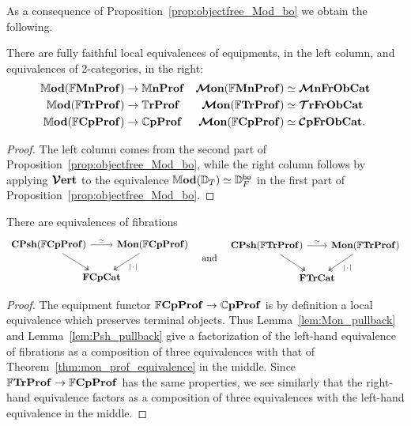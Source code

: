 \documentclass[11pt,oneside,article]{memoir}
\begin{document}
As a consequence of Proposition~\ref{prop:objectfree_Mod_bo} we obtain the following.
\begin{corollary}
      \label{cor:TrCat_ObjectFree}
   There are fully faithful local equivalences of equipments, in the left column, and equivalences
   of 2-categories, in the right:
   \begin{align*}
      \mathbb{M}\mathbf{od}(\mathbb{F}\mathbf{MnProf})  &\to \mathbb{M}\mathbf{nProf} &\bm{\mathcal{M}}\mathbf{on}(\mathbb{F}\mathbf{MnProf})&\simeq\bm{\mathcal{M}}\mathbf{nFrObCat}\\
      \mathbb{M}\mathbf{od}(\mathbb{F}\mathbf{TrProf})   &\to \mathbb{T}\mathbf{rProf}  &\bm{\mathcal{M}}\mathbf{on}(\mathbb{F}\mathbf{TrProf})&\simeq\bm{\mathcal{T}}\mathbf{rFrObCat}\\
      \mathbb{M}\mathbf{od}(\mathbb{F}\mathbf{CpProf}) &\to \mathbb{C}\mathbf{pProf} &\bm{\mathcal{M}}\mathbf{on}(\mathbb{F}\mathbf{CpProf})&\simeq\bm{\mathcal{C}}\mathbf{pFrObCat}.
   \end{align*}
\end{corollary}
\begin{proof}
   The left column comes from the second part of Proposition~\ref{prop:objectfree_Mod_bo}, while
   the right column follows by applying $\bm{\mathcal{V}}\mathbf{ert}$ to the equivalence
   $\mathbb{M}\mathbf{od}(\mathbb{D}_T)\simeq\mathbb{D}^{\mathsf{bo}}_F$ in the first part of
   Proposition~\ref{prop:objectfree_Mod_bo}.
\end{proof}

\begin{lemma}
      \label{lem:FrCompProf_Psh_Mon}
   There are equivalences of fibrations
   \begin{equation*}
      \begin{tikzcd}[column sep=-1.25em]
         \CPsh(\dFrCompProf) \ar[rr,"\equiv"] \ar[dr,two heads]
            && \Mon(\dFrCompProf) \ar[dl,two heads,"\MOb"] \\
            & \FrCompCat &
      \end{tikzcd}
      \quad\tn{and}\quad
        \begin{tikzcd}[column sep=-1.25em]
         \CPsh(\dFrTrProf) \ar[rr,"\equiv"] \ar[dr,two heads]
            && \Mon(\dFrTrProf) \ar[dl,two heads,"\MOb"] \\
            & \FrTrCat &
      \end{tikzcd}
   \end{equation*}
\end{lemma}
\begin{proof}
   The equipment functor $\mathbb{F}\mathbf{CpProf}\to\mathbb{C}\mathbf{pProf}$ is by definition a local equivalence which preserves terminal objects.  Thus Lemma~\ref{lem:Mon_pullback} and Lemma~\ref{lem:Psh_pullback} give a factorization of the left-hand equivalence of fibrations as a composition of three equivalences with that of Theorem~\ref{thm:mon_prof_equivalence} in the middle.  Since $\mathbb{F}\mathbf{TrProf}\to\mathbb{F}\mathbf{CpProf}$ has the same properties, we see similarly that the right-hand equivalence factors as a composition of three equivalences with the left-hand equivalence in the middle.
\end{proof}
\end{document}

